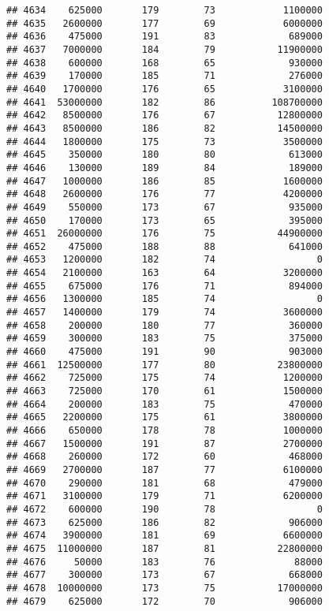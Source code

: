 \documentclass[
]{article}
\begin{document}
\begin{verbatim}
## 4634    625000       179        73            1100000
## 4635   2600000       177        69            6000000
## 4636    475000       191        83             689000
## 4637   7000000       184        79           11900000
## 4638    600000       168        65             930000
## 4639    170000       185        71             276000
## 4640   1700000       176        65            3100000
## 4641  53000000       182        86          108700000
## 4642   8500000       176        67           12800000
## 4643   8500000       186        82           14500000
## 4644   1800000       175        73            3500000
## 4645    350000       180        80             613000
## 4646    130000       189        84             189000
## 4647   1000000       186        85            1600000
## 4648   2600000       176        77            4200000
## 4649    550000       173        67             935000
## 4650    170000       173        65             395000
## 4651  26000000       176        75           44900000
## 4652    475000       188        88             641000
## 4653   1200000       182        74                  0
## 4654   2100000       163        64            3200000
## 4655    675000       176        71             894000
## 4656   1300000       185        74                  0
## 4657   1400000       179        74            3600000
## 4658    200000       180        77             360000
## 4659    300000       183        75             375000
## 4660    475000       191        90             903000
## 4661  12500000       177        80           23800000
## 4662    725000       175        74            1200000
## 4663    725000       170        61            1500000
## 4664    200000       183        75             470000
## 4665   2200000       175        61            3800000
## 4666    650000       178        78            1000000
## 4667   1500000       191        87            2700000
## 4668    260000       172        60             468000
## 4669   2700000       187        77            6100000
## 4670    290000       181        68             479000
## 4671   3100000       179        71            6200000
## 4672    600000       190        78                  0
## 4673    625000       186        82             906000
## 4674   3900000       181        69            6600000
## 4675  11000000       187        81           22800000
## 4676     50000       183        76              88000
## 4677    300000       173        67             668000
## 4678  10000000       173        75           17000000
## 4679    625000       172        70             906000

\end{verbatim}
\end{document}
